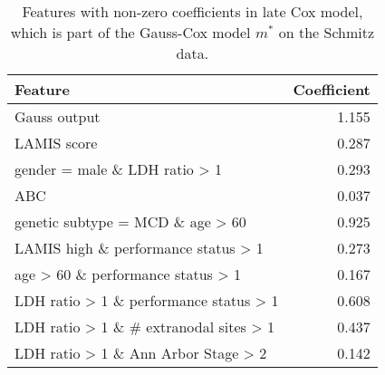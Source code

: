 \begin{table}[ht]
    \centering
    \small
    \begin{tabular}{lr}
        \hline
        \textbf{Feature} & \textbf{Coefficient} \\
        \hline
        Gauss output & \num{1.155} \\
        LAMIS score & \num{0.287} \\
        gender = male \& LDH ratio > 1 & \num{0.293} \\
        ABC & \num{0.037} \\
        genetic subtype = MCD \& age > 60 & \num{0.925} \\
        LAMIS high \& performance status > 1 & \num{0.273} \\
        age > 60 \& performance status > 1 & \num{0.167} \\
        LDH ratio > 1 \& performance status > 1 & \num{0.608} \\
        LDH ratio > 1 \& \# extranodal sites > 1 & \num{0.437} \\
        LDH ratio > 1 \& Ann Arbor Stage > 2 & \num{0.142} \\
        \hline
        \end{tabular}
    \caption{Features with non-zero coefficients in late Cox model, which is part of the 
        Gauss-Cox model $m^*$ on the Schmitz data.}
\end{table}